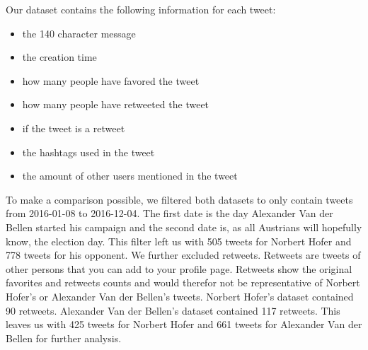 \documentclass{llncs}
\begin{document}
Our dataset contains the following information for each tweet:
\begin{itemize} 
	\item the 140 character message 
	\item the creation time
	\item how many people have favored the tweet
	\item how many people have retweeted the tweet
	\item if the tweet is a retweet 
	\item the hashtags used in the tweet
	\item the amount of other users mentioned in the tweet
\end{itemize}

To make a comparison possible, we filtered both datasets to only contain tweets from 2016-01-08 to 2016-12-04. The first date is the day Alexander Van der Bellen started his campaign and the second date is, as all Austrians will hopefully know, the election day. This filter left us with 505 tweets for Norbert Hofer and 778 tweets for his opponent. We further excluded retweets. Retweets are tweets of other persons that you can add to your profile page. Retweets show the original favorites and retweets counts and would therefor not be representative of Norbert Hofer's or Alexander Van der Bellen's tweets. Norbert Hofer's dataset contained 90 retweets. Alexander Van der Bellen's dataset contained 117 retweets. This leaves us with 425 tweets for Norbert Hofer and 661 tweets for Alexander Van der Bellen for further analysis. 
\newpage
\end{document}
